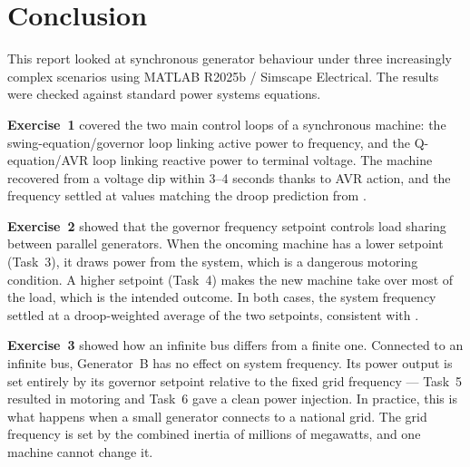 \section{Conclusion}

This report looked at synchronous generator behaviour under three increasingly
complex scenarios using MATLAB R2025b / Simscape Electrical. The results were
checked against standard power systems equations.

\textbf{Exercise~1} covered the two main control loops of a synchronous
machine: the swing-equation/governor loop linking active power to frequency,
and the Q-equation/AVR loop linking reactive power to terminal voltage. The
 machine recovered from a  voltage dip within 3--4 seconds
thanks to AVR action, and the frequency settled at values matching the droop
prediction from .

\textbf{Exercise~2} showed that the governor frequency setpoint controls load
sharing between parallel generators. When the oncoming machine has a lower
setpoint (Task~3), it draws power from the system, which is a dangerous
motoring condition. A higher setpoint (Task~4) makes the new machine take over
most of the load, which is the intended outcome. In both cases, the system
frequency settled at a droop-weighted average of the two setpoints, consistent
with .

\textbf{Exercise~3} showed how an infinite bus differs from a finite one.
Connected to an infinite bus, Generator~B has no effect on system frequency.
Its power output is set entirely by its governor setpoint relative to the fixed
grid frequency --- Task~5 resulted in motoring and Task~6 gave a clean power
injection. In practice, this is what happens when a small generator connects to
a national grid. The grid frequency is set by the combined inertia of millions
of megawatts, and one machine cannot change it.
